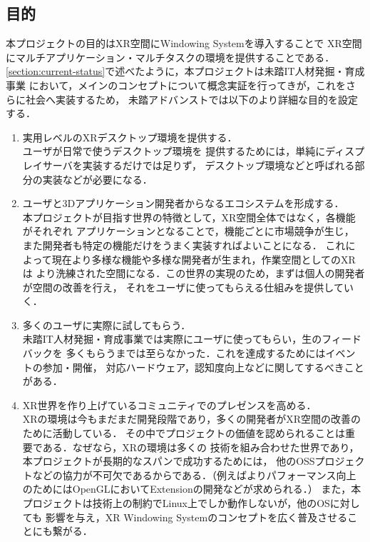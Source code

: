 \subsection{目的}
\label{section:objective}

本プロジェクトの目的はXR空間にWindowing Systemを導入することで
XR空間にマルチアプリケーション・マルチタスクの環境を提供することである．
\ref{section:current-status}で述べたように，本プロジェクトは未踏IT人材発掘・育成事業
において，メインのコンセプトについて概念実証を行ってきが，これをさらに社会へ実装するため，
未踏アドバンストでは以下のより詳細な目的を設定する．

\begin{enumerate}
  \item 実用レベルのXRデスクトップ環境を提供する．\\
        ユーザが日常で使うデスクトップ環境を
        提供するためには，単純にディスプレイサーバを実装するだけでは足りず，
        デスクトップ環境などと呼ばれる部分の実装などが必要になる．
  \item ユーザと3Dアプリケーション開発者からなるエコシステムを形成する．\\ %
        本プロジェクトが目指す世界の特徴として，XR空間全体ではなく，各機能がそれぞれ
        アプリケーションとなることで，機能ごとに市場競争が生じ，
        また開発者も特定の機能だけをうまく実装すればよいことになる．
        これによって現在より多様な機能や多様な開発者が生まれ，作業空間としてのXRは
        より洗練された空間になる．この世界の実現のため，まずは個人の開発者が空間の改善を行え，
        それをユーザに使ってもらえる仕組みを提供していく．
  \item 多くのユーザに実際に試してもらう．\\
        未踏IT人材発掘・育成事業では実際にユーザに使ってもらい，生のフィードバックを
        多くもらうまでは至らなかった．これを達成するためにはイベントの参加・開催，
        対応ハードウェア，認知度向上などに関してするべきことがある．
  \item XR世界を作り上げているコミュニティでのプレゼンスを高める．\\
        XRの環境は今もまだまだ開発段階であり，多くの開発者がXR空間の改善のために活動している．
        その中でプロジェクトの価値を認められることは重要である．なぜなら，XRの環境は多くの
        技術を組み合わせた世界であり，本プロジェクトが長期的なスパンで成功するためには，
        他のOSSプロジェクトなどの協力が不可欠であるからである．（例えばよりパフォーマンス向上
        のためにはOpenGLにおいてExtensionの開発などが求められる．）
        また，本プロジェクトは技術上の制約でLinux上でしか動作しないが，他のOSに対しても
        影響を与え，XR Windowing Systemのコンセプトを広く普及させることにも繋がる．
\end{enumerate}
